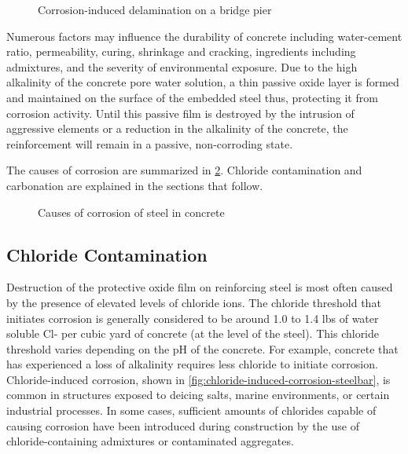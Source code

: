 \begin{figure}
  \caption{Corrosion-induced delamination on a bridge pier}
  \label{fig:corrosion-induced-delamination}
\end{figure}

Numerous factors may influence the durability of concrete including water-cement ratio, permeability, curing, shrinkage and cracking, ingredients including admixtures, and the severity of environmental exposure. Due to the high alkalinity of the concrete pore water solution, a thin passive oxide layer is formed and maintained on the surface of the embedded steel thus, protecting it from corrosion activity. Until this passive film is destroyed by the intrusion of aggressive elements or a reduction in the alkalinity of the concrete, the reinforcement will remain in a passive, non-corroding state.

The causes of corrosion are summarized in \cref{fig:causes-of-corrosion-steelbar}. Chloride contamination and carbonation are explained in the sections that follow.

\begin{figure}
  \caption{Causes of corrosion of steel in concrete}
  \label{fig:causes-of-corrosion-steelbar}
\end{figure}


\subsection{Chloride Contamination}
Destruction of the protective oxide film on reinforcing steel is most often caused by the presence of elevated
levels of chloride ions. The chloride threshold that initiates corrosion is generally considered to be around 1.0 to 1.4
lbs of water soluble Cl- per cubic yard of concrete (at the level of the steel). This chloride threshold varies depending
on the pH of the concrete. For example, concrete that has experienced a loss of alkalinity requires less chloride to
initiate corrosion. Chloride-induced corrosion, shown in \cref{fig:chloride-induced-corrosion-steelbar}, is common in structures exposed to deicing salts,
marine environments, or certain industrial processes. In some cases, sufficient amounts of chlorides capable of
causing corrosion have been introduced during construction by the use of chloride-containing admixtures or
contaminated aggregates.

